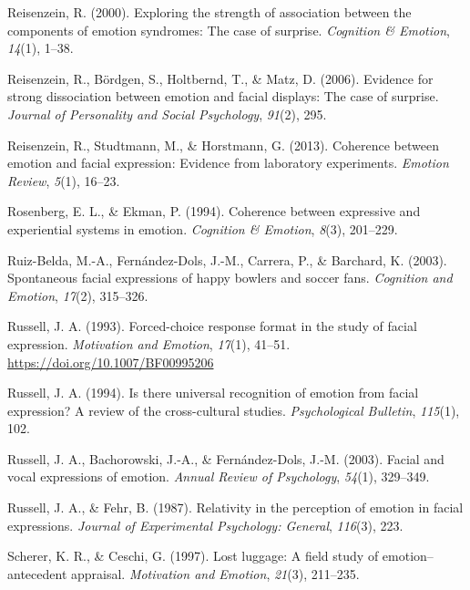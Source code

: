 \documentclass[man]{apa6}
\begin{document}
\leavevmode\hypertarget{ref-reisenzein2000exploring}{}%
Reisenzein, R. (2000). Exploring the strength of association between the components of emotion syndromes: The case of surprise. \emph{Cognition \& Emotion}, \emph{14}(1), 1--38.

\leavevmode\hypertarget{ref-reisenzein2006evidence}{}%
Reisenzein, R., Bördgen, S., Holtbernd, T., \& Matz, D. (2006). Evidence for strong dissociation between emotion and facial displays: The case of surprise. \emph{Journal of Personality and Social Psychology}, \emph{91}(2), 295.

\leavevmode\hypertarget{ref-reisenzein2013coherence}{}%
Reisenzein, R., Studtmann, M., \& Horstmann, G. (2013). Coherence between emotion and facial expression: Evidence from laboratory experiments. \emph{Emotion Review}, \emph{5}(1), 16--23.

\leavevmode\hypertarget{ref-rosenberg1994coherence}{}%
Rosenberg, E. L., \& Ekman, P. (1994). Coherence between expressive and experiential systems in emotion. \emph{Cognition \& Emotion}, \emph{8}(3), 201--229.

\leavevmode\hypertarget{ref-ruiz2003spontaneous}{}%
Ruiz-Belda, M.-A., Fernández-Dols, J.-M., Carrera, P., \& Barchard, K. (2003). Spontaneous facial expressions of happy bowlers and soccer fans. \emph{Cognition and Emotion}, \emph{17}(2), 315--326.

\leavevmode\hypertarget{ref-russell1993forced}{}%
Russell, J. A. (1993). Forced-choice response format in the study of facial expression. \emph{Motivation and Emotion}, \emph{17}(1), 41--51. \url{https://doi.org/10.1007/BF00995206}

\leavevmode\hypertarget{ref-russell1994there}{}%
Russell, J. A. (1994). Is there universal recognition of emotion from facial expression? A review of the cross-cultural studies. \emph{Psychological Bulletin}, \emph{115}(1), 102.

\leavevmode\hypertarget{ref-russell2003facial}{}%
Russell, J. A., Bachorowski, J.-A., \& Fernández-Dols, J.-M. (2003). Facial and vocal expressions of emotion. \emph{Annual Review of Psychology}, \emph{54}(1), 329--349.

\leavevmode\hypertarget{ref-russell1987relativity}{}%
Russell, J. A., \& Fehr, B. (1987). Relativity in the perception of emotion in facial expressions. \emph{Journal of Experimental Psychology: General}, \emph{116}(3), 223.

\leavevmode\hypertarget{ref-scherer1997lost}{}%
Scherer, K. R., \& Ceschi, G. (1997). Lost luggage: A field study of emotion--antecedent appraisal. \emph{Motivation and Emotion}, \emph{21}(3), 211--235.
\end{document}
